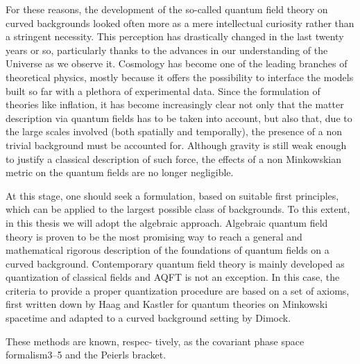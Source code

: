 \documentclass[Main]{subfiles}
\begin{document}
\begin{Warning}
For these reasons, the development of the so-called quantum field theory on curved backgrounds looked often more as a mere intellectual curiosity rather than a stringent necessity. This perception has drastically changed in the last twenty years or so, particularly thanks to the advances in our understanding of the Universe as we observe it. Cosmology has become one of the leading branches of theoretical physics, mostly because it offers the possibility to interface the models built so far with a plethora of experimental data. 
Since the formulation of theories like inflation, it has become increasingly clear not only that the matter description via quantum fields has to be taken into account, but also that, due to the large scales involved (both spatially and temporally), the presence of a non trivial background must be accounted for. Although gravity is still weak enough to justify a classical description of such force, the effects of a non Minkowskian metric on the quantum fields are no longer negligible.

At this stage, one should seek a formulation, based on suitable first principles, which can be applied to the largest possible class of backgrounds.  To this extent, in this thesis we will adopt the algebraic approach. 
Algebraic quantum field theory is proven to be the most promising way to reach a general and mathematical rigorous description of the foundations of quantum fields on a curved background.
Contemporary quantum field theory is mainly developed as quantization of classical fields and AQFT is not an exception.
In this case, the criteria to provide a proper quantization procedure are based on a set of axioms, first written down by Haag and Kastler for quantum theories on Minkowski spacetime and adapted to a curved background setting by Dimock.

These methods are known, respec- tively, as the covariant phase space formalism3–5 and the Peierls bracket. 


\end{Warning}
\end{document}

